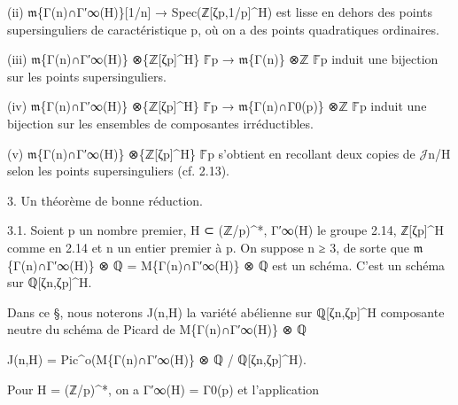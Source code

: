 \documentclass[11pt,a4paper]{article}
\begin{document}
(ii)        \ensuremath{\mathfrak{m}}\textunderscore{}\{Γ(n)∩Γ′\textunderscore{}∞(H)\}[1/n] → Spec(ℤ[ζ\textunderscore{}p,1/p]\textasciicircum{}H) est lisse en dehors des points supersinguliers de caractéristique p, où on a des points quadratiques ordinaires.

(iii)        \ensuremath{\mathfrak{m}}\textunderscore{}\{Γ(n)∩Γ′\textunderscore{}∞(H)\} ⊗\textunderscore{}\{ℤ[ζ\textunderscore{}p]\textasciicircum{}H\} \ensuremath{\mathbb{F}}̄\textunderscore{}p → \ensuremath{\mathfrak{m}}\textunderscore{}\{Γ(n)\} ⊗\textunderscore{}ℤ \ensuremath{\mathbb{F}}̄\textunderscore{}p induit une bijection sur les points supersinguliers.

(iv)        \ensuremath{\mathfrak{m}}\textunderscore{}\{Γ(n)∩Γ′\textunderscore{}∞(H)\} ⊗\textunderscore{}\{ℤ[ζ\textunderscore{}p]\textasciicircum{}H\} \ensuremath{\mathbb{F}}̄\textunderscore{}p → \ensuremath{\mathfrak{m}}\textunderscore{}\{Γ(n)∩Γ\textunderscore{}0(p)\} ⊗\textunderscore{}ℤ \ensuremath{\mathbb{F}}̄\textunderscore{}p induit une bijection sur les ensembles de composantes irréductibles.

(v)        \ensuremath{\mathfrak{m}}\textunderscore{}\{Γ(n)∩Γ′\textunderscore{}∞(H)\} ⊗\textunderscore{}\{ℤ[ζ\textunderscore{}p]\textasciicircum{}H\} \ensuremath{\mathbb{F}}̄\textunderscore{}p s'obtient en recollant deux copies de \ensuremath{\mathcal{J}}\textunderscore{}n/H selon les points supersinguliers (cf. 2.13).

3. Un théorème de bonne réduction.

3.1. Soient p un nombre premier, H ⊂ (ℤ/p)\textasciicircum{}*, Γ′\textunderscore{}∞(H) le groupe 2.14, ℤ[ζ\textunderscore{}p]\textasciicircum{}H comme en 2.14 et n un entier premier à p. On suppose n ≥ 3, de sorte que \ensuremath{\mathfrak{m}}\textunderscore{}\{Γ(n)∩Γ′\textunderscore{}∞(H)\} ⊗ ℚ = M\textunderscore{}\{Γ(n)∩Γ′\textunderscore{}∞(H)\} ⊗ ℚ est un schéma. C'est un schéma sur ℚ[ζ\textunderscore{}n,ζ\textunderscore{}p]\textasciicircum{}H.

Dans ce §, nous noterons J(n,H) la variété abélienne sur ℚ[ζ\textunderscore{}n,ζ\textunderscore{}p]\textasciicircum{}H composante neutre du schéma de Picard de M\textunderscore{}\{Γ(n)∩Γ′\textunderscore{}∞(H)\} ⊗ ℚ

J(n,H) = Pic\textasciicircum{}o(M\textunderscore{}\{Γ(n)∩Γ′\textunderscore{}∞(H)\} ⊗ ℚ / ℚ[ζ\textunderscore{}n,ζ\textunderscore{}p]\textasciicircum{}H).

Pour H = (ℤ/p)\textasciicircum{}*, on a Γ′\textunderscore{}∞(H) = Γ\textunderscore{}0(p) et l'application
\end{document}
